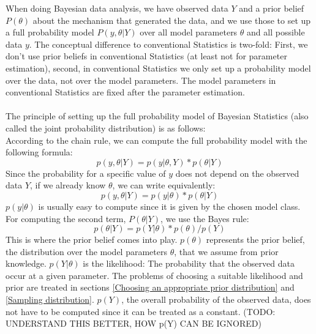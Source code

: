 \documentclass{article}
\begin{document}
When doing Bayesian data analysis, we have observed data $Y$ and a prior belief $P(\theta)$ about the mechanism that generated the data, and we use those to set up a full probability model $P(y,\theta|Y)$ over all model parameters $\theta$ and all possible data $y$. The conceptual difference to conventional Statistics is two-fold: First, we don't use prior beliefs in conventional Statistics (at least not for parameter estimation), second, in conventional Statistics we only set up a probability model over the data, not over the model parameters. The model parameters in conventional Statistics are fixed after the parameter estimation.
\\
\\
The principle of setting up the full probability model of Bayesian Statistics (also called the joint probability distribution) is as follows:
\\
According to the chain rule, we can compute the full probability model with the following formula:
\begin{equation}
p(y,\theta|Y) = p(y|\theta,Y) * p(\theta|Y)
\end{equation}
Since the probability for a specific value of $y$ does not depend on the observed data $Y$, if we already know $\theta$, we can write equivalently:
\begin{equation}
p(y,\theta|Y) = p(y|\theta) * p(\theta|Y)
\end{equation}
$p(y|\theta)$ is usually easy to compute since it is given by the chosen model class. For computing the second term, $P(\theta|Y)$, we use the Bayes rule:
\begin{equation}
p(\theta|Y) = p(Y|\theta) * p(\theta) / p(Y)
\end{equation}
This is where the prior belief comes into play.  $p(\theta)$ represents the prior belief, the distribution over the model parameters $\theta$, that we assume from prior knowledge. $p(Y|\theta)$ is the likelihood: The probability that the observed data occur at a given parameter. The problems of choosing a suitable likelihood and prior are treated in sections \ref{Choosing an appropriate prior distribution} and \ref{Sampling distribution}. $p(Y)$, the overall probability of the observed data, does not have to be computed since it can be treated as a constant. (TODO: UNDERSTAND THIS BETTER, HOW p(Y) CAN BE IGNORED)
\end{document}

